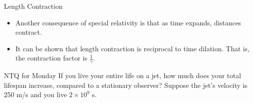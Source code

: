 \documentclass[english]{beamer}
\begin{document}
\begin{frame}{Length Contraction}
  \begin{itemize}
    \item Another consequence of special relativity is that as time expands, distances contract.
    \item It can be shown that length contraction is reciprocal to time dilation. That is, the contraction factor is $\frac{1}{\gamma}$.
  \end{itemize}
\end{frame}

\begin{frame}{NTQ for Monday}
  If you live your entire life on a jet, how much does your total lifespan increase, compared to a stationary observer? Suppose the jet's velocity is 250 m/s and you live $2\times10^9$ s.
\end{frame}
\end{document}
